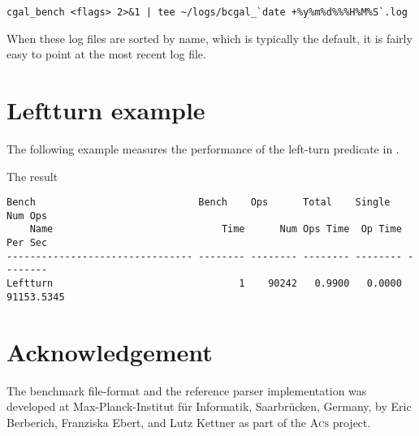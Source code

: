\begin{verbatim}
cgal_bench <flags> 2>&1 | tee ~/logs/bcgal_`date +%y%m%d%%%H%M%S`.log
\end{verbatim}

When these log files are sorted by name, which is typically the
default, it is fairly easy to point at the most recent log file.

\section{Leftturn example}
The following example measures the performance of the left-turn predicate
in \cgal.

The result
\begin{verbatim}
Bench                            Bench    Ops      Total    Single   Num Ops
    Name                             Time      Num Ops Time  Op Time  Per Sec
-------------------------------- -------- -------- -------- -------- --------
Leftturn                                1    90242   0.9900   0.0000 91153.5345
\end{verbatim}

\section{Acknowledgement}
The benchmark file-format and the reference parser implementation was 
developed at Max-Planck-Institut f\"ur Informatik, Saarbr\"ucken, Germany, by
Eric Berberich, Franziska Ebert, and Lutz Kettner as part of the 
\textsc{Acs} project.
 

